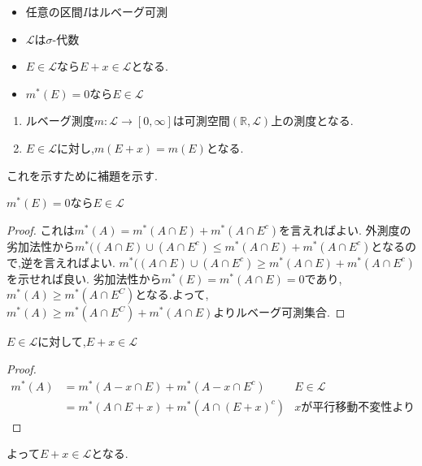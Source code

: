 \begin{thm}
  \begin{itemize}
    \item 任意の区間$I$はルベーグ可測
    \item $\mathcal{L}$は$\sigma$-代数
    \item $E \in \mathcal{L}$なら$E +x \in \mathcal{L}$となる.
    \item $m^*(E)=0$なら$E \in \mathcal{L}$
  \end{itemize}
\end{thm}


\begin{thm}
  \begin{enumerate}
    \item ルベーグ測度$m: \mathcal{L} \to [0, \infty]$は可測空間$(\mathbb{R}, \mathcal{L})$上の測度となる.
    \item $E \in \mathcal{L}$に対し,$m(E+x) = m(E)$となる.
  \end{enumerate}
\end{thm}

これを示すために補題を示す.

\begin{lem}
 $m^*(E)=0$なら$E \in \mathcal{L}$
\end{lem}
\begin{proof}
これは$m^*(A)=m^*(A \cap E) + m^*(A \cap E^c)$を言えればよい.
外測度の劣加法性から$m^*((A\cap E) \cup  (A \cap E^c) \le m^*(A \cap E) + m^*(A \cap E^c)$となるので,逆を言えればよい.
$m^*((A\cap E) \cup  (A \cap E^c) \ge m^*(A \cap E) + m^*(A \cap E^c)$を示せれば良い.
劣加法性から$m^*(E) = m^*(A \cap E) =0$であり,$m^*(A) \ge m^*(A \cap E^C)$となる.よって,
$m^*(A) \ge m^*(A \cap E^C) + m^*(A \cap E)$よりルベーグ可測集合.
\end{proof}


\begin{lem}
  $E \in \mathcal{L}$に対して,$E+x \in \mathcal{L}$
\end{lem}
\begin{proof}
  \begin{align*}
  m^*(A) &= m^*(A-x \cap E) + m^*(A-x \cap E^c)  & E \in \mathcal{L} \\
         &= m^*(A \cap E +x) + m^*(A \cap (E+x)^c ) & x \mbox{が平行移動不変性より}
  \end{align*}
\end{proof}
よって$E+x \in \mathcal{L}$となる.

